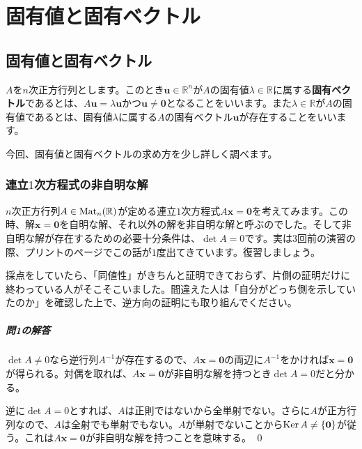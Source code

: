 \chapter{固有値と固有ベクトル}

\section{固有値と固有ベクトル}

$A$を$n$次正方行列とします。このとき$\bm{u} \in \mathbb{R}^n$が$A$の固有値$\lambda \in \mathbb{R}$に属する\textbf{固有ベクトル}であるとは、$A\bm{u} = \lambda \bm{u}$かつ$\bm{u} \neq \bm{0}$となることをいいます。また$\lambda \in \mathbb{R}$が$A$の固有値であるとは、固有値$\lambda$に属する$A$の固有ベクトル$\bm{u}$が存在することをいいます。

今回、固有値と固有ベクトルの求め方を少し詳しく調べます。

\subsection{連立$1$次方程式の非自明な解}

$n$次正方行列$A \in \operatorname{Mat}_n(\mathbb{R})$が定める連立$1$次方程式$A \bm{x} = \bm{0}$を考えてみます。この時、解$\bm{x} = \bm{0}$を自明な解、それ以外の解を非自明な解と呼ぶのでした。そして非自明な解が存在するための必要十分条件は、$\det A = 0$です。実は$3$回前の演習の際、プリントの\pageref{subsection:non-trivial_answer}ページでこの話が$1$度出てきています。復習しましょう。

採点をしていたら、「同値性」がきちんと証明できておらず、片側の証明だけに終わっている人がそこそこいました。間違えた人は「自分がどっち側を示していたのか」を確認した上で、逆方向の証明にも取り組んでください。

\paragraph{問1の解答}

$\det A \neq 0$なら逆行列$A^{-1}$が存在するので、$A\bm{x} = \bm{0}$の両辺に$A^{-1}$をかければ$\bm{x} = \bm{0}$が得られる。対偶を取れば、$A\bm{x} = \bm{0}$が非自明な解を持つとき$\det A = 0$だと分かる。

逆に$\det A = 0$とすれば、$A$は正則ではないから全単射でない。さらに$A$が正方行列なので、$A$は全射でも単射でもない。$A$が単射でないことから$\operatorname{Ker} A \neq \{\boldsymbol{0}\}$が従う。これは$A\bm{x} = \bm{0}$が非自明な解を持つことを意味する。 \qed

